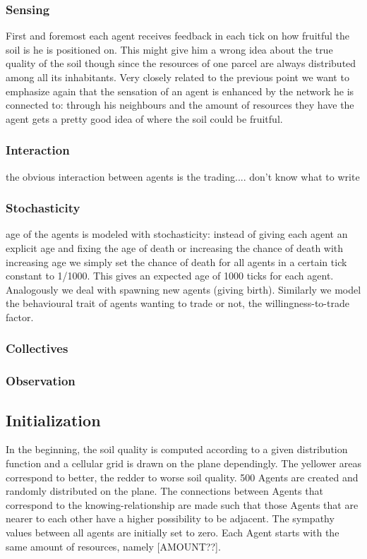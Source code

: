 \documentclass{JASSS}
\begin{document}
\subsubsection{Sensing}
	First and foremost each agent receives feedback in each tick on how fruitful the soil is he is positioned on. This might give him a wrong idea about the true quality of the soil though since the resources of one parcel are always distributed among all its inhabitants. Very closely related to the previous point we want to emphasize again that the sensation of an agent is enhanced by the network he is connected to: through his neighbours and the amount of resources they have the agent gets a pretty good idea of where the soil could be fruitful.

\subsubsection{Interaction}
	the obvious interaction between agents is the trading.... don't know what to write

\subsubsection{Stochasticity}
	age of the agents is modeled with stochasticity: instead of giving each agent an explicit age and fixing the age of death or increasing the chance of death with increasing age we simply set the chance of death for all agents in a certain tick constant to 1/1000. This gives an expected age of 1000 ticks for each agent. Analogously we deal with spawning new agents (giving birth). Similarly we model the behavioural trait of agents wanting to trade or not, the willingness-to-trade factor.  

\subsubsection{Collectives}
\subsubsection{Observation}

\subsection{Initialization}
	In the beginning, the soil quality is computed according to a given distribution function and a cellular grid is drawn on the plane dependingly. The yellower areas correspond to better, the redder to worse soil quality. 500 Agents are created and randomly distributed on the plane. The connections between Agents that correspond to the knowing-relationship are made such that those Agents that are nearer to each other have a higher possibility to be adjacent. The sympathy values between all agents are initially set to zero. Each Agent starts with the same amount of resources, namely [AMOUNT??].
\end{document}
